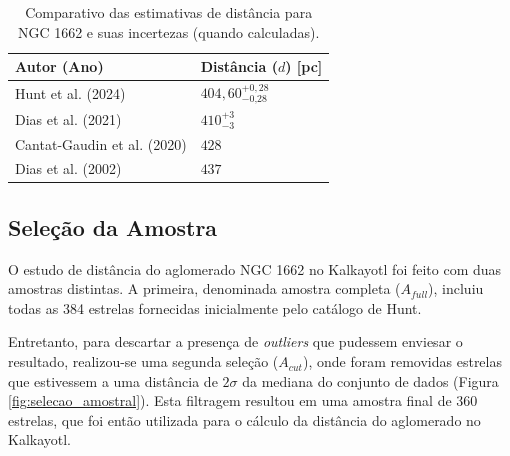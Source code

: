 \documentclass[12pt]{projeto}
\begin{document}
\begin{table}[ht]
    \centering
    \caption{Comparativo das estimativas de distância para NGC 1662 e suas incertezas (quando calculadas).}
    \label{tab:comparativo_distancias_incerteza}
    \renewcommand{\arraystretch}{1.3} %
    \begin{tabular}{|>{\centering}m{5cm}|>{\centering\arraybackslash}m{4cm}|}
        \hline
        \textbf{Autor (Ano)} & \textbf{Distância ($d$) [pc]} \\
        \hline
        Hunt et al. (2024) & $404,60^{+0,28}_{-\text{0,28}}$ \\
        \hline
        Dias et al. (2021) &  $410^{+3}_{-\text{3}}$ \\
        \hline
        Cantat-Gaudin et al. (2020) & $428$ \\
        \hline
        Dias et al. (2002) & $437$ \\
        \hline
    \end{tabular}
    \renewcommand{\arraystretch}{1.0} %
\end{table}

\subsection{Seleção da Amostra}

O estudo de distância do aglomerado NGC 1662 no Kalkayotl foi feito com duas amostras distintas. A primeira, denominada amostra completa (\(A_{full}\)), incluiu todas as 384 estrelas fornecidas inicialmente pelo catálogo de Hunt. 

Entretanto, para descartar a presença de \textit{outliers} que pudessem enviesar o resultado, realizou-se uma segunda seleção (\(A_{cut}\)), onde foram removidas estrelas que estivessem a uma distância de \(2\sigma\) da mediana do conjunto de dados (Figura \ref{fig:selecao_amostral}). Esta filtragem resultou em uma amostra final de 360 estrelas, que foi então utilizada para o cálculo da distância do aglomerado no Kalkayotl.
\end{document}
